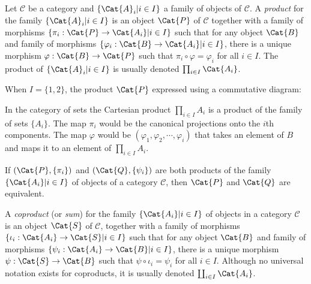 \begin{definition}
	Let $ \mathscr{C} $ be a category and $ \{\Cat{A}_i|i\in I \} $ a family of objects of $ \mathscr{C} $. A \textit{product} for the family $ \{\Cat{A}_i|i\in I \} $ is an object $ \Cat{P} $ of $ \mathscr{C} $ together with a family of morphisms $ \{\pi_i: \Cat{P} \to \Cat{A_i}|i \in I \} $ such that for any object $ \Cat{B} $ and family of morphisms $ \{\varphi_i: \Cat{B} \to \Cat{A_i}|i \in I \} $, there is a unique morphism $ \varphi :\Cat{B} \to \Cat{P} $ such that $ \pi_i \circ \varphi = \varphi_i $ for all $ i \in I $. The product of $ \{\Cat{A}_i|i\in I \} $ is usually denoted $ \prod_{i\in I}\Cat{A_i} $.
\end{definition}
When $ I=\{1,2 \} $, the product $ \Cat{P}$ expressed using a commutative diagram:
\newpara
In the category of sets the Cartesian product $ \prod_{i\in I} A_i $ is a product of the family of sets $ \{A_i \} $. The map $ \pi_i $ would be the canonical projections onto the $ i $th components. The map $ \varphi $ would be $ (\varphi_1,\varphi_2,\cdots,\varphi_i) $ that takes an element of $ B $ and maps it to an element of $ \prod_{i\in I} A_i $.
\begin{theorem}
	If $ (\Cat{P},\{\pi_i \}) $ and $ (\Cat{Q},\{\psi_i\}) $ are both products of the family $ \{\Cat{A_i}|i\in I  \} $ of objects of a category $ \mathscr{C} $, then $ \Cat{P} $ and $ \Cat{Q} $ are equivalent.
\end{theorem}
\begin{definition}
	A \textit{coproduct} (or \textit{sum}) for the family $ \{\Cat{A_i}|i \in I \} $ of objects in a category $ \mathscr{C} $ is an object $ \Cat{S} $ of $ \mathscr{C} $, together with a family of morphisms $ \{\iota_i:\Cat{A_i}\to \Cat{S}|i \in I \} $ such that for any object $ \Cat{B} $ and family of morphisms $ \{\psi_i:\Cat{A_i}\to \Cat{B} |i \in I \} $, there is a unique morphism $ \psi:\Cat{S} \to \Cat{B} $ such that $ \psi \circ \iota_i = \psi_i $ for all $ i \in I $. Although no universal notation exists for coproducts, it is usually denoted $ \coprod_{i \in I }\Cat{A_i} $.
\end{definition}
